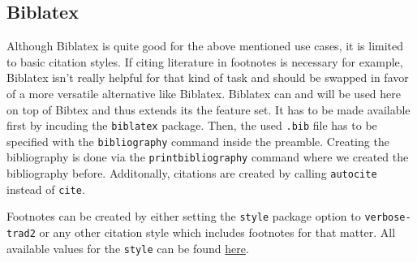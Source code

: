 \documentclass{article}
\begin{document}
\subsection{Biblatex}

Although Biblatex is quite good for the above mentioned use cases, it is limited
to basic citation styles. If citing literature in footnotes is necessary for
example, Biblatex isn't really helpful for that kind of task and should be
swapped in favor of a more versatile alternative like Biblatex. Biblatex can
and will be used here on top of Bibtex and thus extends its the feature set. It
has to be made available first by incuding the \texttt{biblatex} package. Then,
the used \texttt{.bib} file has to be specified with the \texttt{bibliography}
command inside the preamble. Creating the bibliography is done via the
\texttt{printbibliography} command where we created the bibliography before.
Additonally, citations are created by calling \texttt{autocite} instead of
\texttt{cite}.

Footnotes can be created by either setting the \texttt{style} package option to
\texttt{verbose-trad2} or any other citation style which includes footnotes for
that matter. All available values for the \texttt{style} can be found \href{https://ctan.joethei.xyz/macros/latex/contrib/biblatex/doc/biblatex.pdf#subsection.3.3}{here}.



\newpage
\printbibliography
\end{document}

